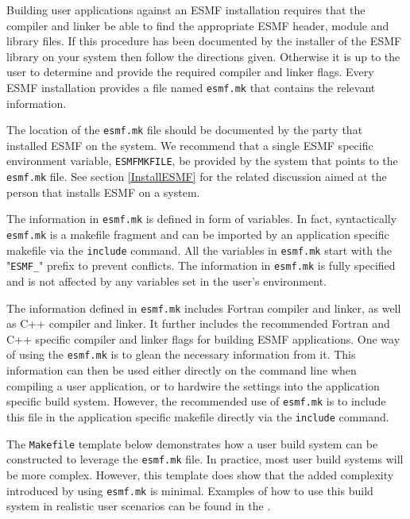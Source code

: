 
Building user applications against an ESMF installation requires that the 
compiler and linker be able to find the appropriate ESMF header, module and 
library files. If this procedure has been documented by the installer of the 
ESMF library on your system then follow the directions given. Otherwise it is up 
to the user to determine and provide the required compiler and linker flags. 
Every ESMF installation provides a file named {\tt esmf.mk} that contains the 
relevant information.

The location of the {\tt esmf.mk} file should be documented by the party that 
installed ESMF on the system. We recommend that a single ESMF specific 
environment variable, {\tt ESMFMKFILE}, be provided by the system that points to 
the {\tt esmf.mk} file. See section \ref{InstallESMF} for the related discussion 
aimed at the person that installs ESMF on a system.

The information in {\tt esmf.mk} is defined in form of variables. In fact, 
syntactically {\tt esmf.mk} is a makefile fragment and can be imported by an 
application specific makefile via the {\tt include} command. All the variables 
in {\tt esmf.mk} start with the "{\tt ESMF\_}" prefix to prevent conflicts. The 
information in {\tt esmf.mk} is fully specified and is not affected by any 
variables set in the user's environment.

The information defined in {\tt esmf.mk} includes Fortran compiler and linker, 
as well as C++ compiler and linker. It further includes the recommended Fortran 
and C++ specific compiler and linker flags for building ESMF applications. One 
way of using the {\tt esmf.mk} is to glean the necessary information from it. 
This information can then be used either directly on the command line when 
compiling a user application, or to hardwire the settings into the application 
specific build system. However, the recommended use of {\tt esmf.mk} is to 
include this file in the application specific makefile directly via the 
{\tt include} command.

The {\tt Makefile} template below demonstrates how a user build system can be 
constructed to leverage the {\tt esmf.mk} file. In practice, most user build 
systems will be more complex. However, this template does show that the added 
complexity introduced by using {\tt esmf.mk} is minimal. Examples of how to use 
this build system in realistic user scenarios can be found in the 
.

